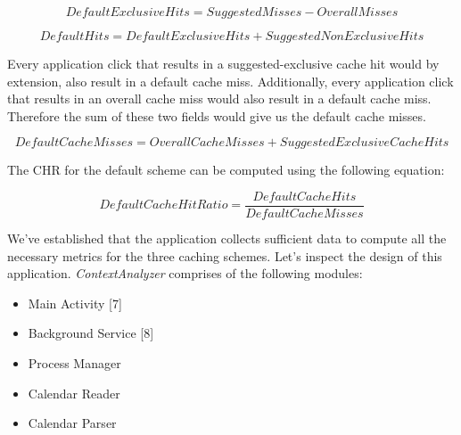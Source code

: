 \documentclass[12pt]{uthesis-v12}  %
\begin{document}
		\begin{equation}
			DefaultExclusive Hits = Suggested Misses - Overall Misses
		\end{equation}
		
		\begin{equation}
			Default Hits = DefaultExclusive Hits + Suggested NonExclusive Hits 
		\end{equation}
		
		Every application click that results in a suggested-exclusive cache hit would by extension, also result in a default cache miss. Additionally, every application click that results in an overall cache miss would also result in a default cache miss. Therefore the sum of these two fields would give us the default cache misses.
		
		\begin{equation}
			Default Cache Misses = Overall Cache Misses + Suggested Exclusive Cache Hits
		\end{equation}
		
		The CHR for the default scheme can be computed using the following equation:
		
		\begin{equation}
			Default Cache Hit Ratio = \frac{Default Cache Hits}{Default Cache Misses}
		\end{equation}
		
		We've established that the application collects sufficient data to compute all the necessary metrics for the three caching schemes. Let's inspect the design of this application. {\em ContextAnalyzer} comprises of the following modules:
		
		\begin{itemize}
			\item Main Activity [7]
			\item Background Service [8]
			\item Process Manager
			\item Calendar Reader
			\item Calendar Parser
		\end{itemize}
		
\end{document}
